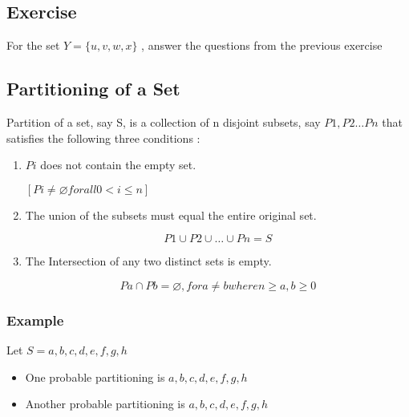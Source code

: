 \documentclass[12pt]{article}
\begin{document}
\subsection*{Exercise}
For the set $Y = \{u,v,w,x\}$ , answer the questions from the
previous exercise



\subsection{Partitioning of a Set}
Partition of a set, say S, is a collection of n disjoint subsets, say $P1,P2 \ldots Pn$  that satisfies the following three conditions :

\begin{enumerate}
\item $Pi$ does not contain the empty set.

 $[Pi \neq {\varnothing} for all 0<i\leq n]$
\item The union of the subsets must equal the entire original set.

\[P1 \cup P2 \cup \ldots \cup Pn=S\]
\item The Intersection of any two distinct sets is empty.

\[Pa \cap Pb={\varnothing}, for a\neq b where n\geq a,b\geq 0\]
\end{enumerate}




\subsubsection*{Example}

Let $S={a,b,c,d,e,f,g,h}$
\begin{itemize}
\item One probable partitioning is ${a},{b,c,d},{e,f,g,h}$
\item Another probable partitioning is ${a,b},{c,d},{e,f,g,h}$
\end{itemize}
\end{document}

